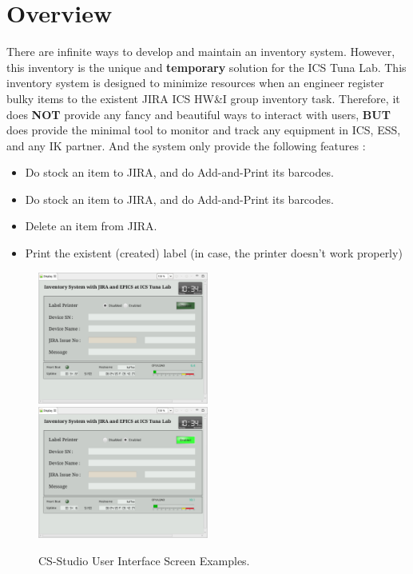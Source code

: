 \documentclass[11pt
  , a4paper
  , article
  , oneside
  , showtrims
]{memoir}
\begin{document}
\chapter{Overview}
There are infinite ways to develop and maintain an inventory system. However, this inventory is the unique and \textbf{temporary} solution for the ICS Tuna Lab. This inventory system is designed to minimize resources when an engineer register bulky items to the existent JIRA ICS HW\&I group inventory task. Therefore, it does \textbf{NOT} provide any fancy and beautiful ways to interact with users, \textbf{BUT} does provide the minimal tool to monitor and track any equipment in ICS, ESS, and any IK partner. And the system only provide the following features :
\begin{itemize}
\item Do stock an item to JIRA, and do Add-and-Print its barcodes.
\item Do stock an item to JIRA, and do Add-and-Print its barcodes.
\item Delete an item from JIRA.
\item Print the existent (created) label (in case, the printer doesn't work properly)
\end{itemize}


\begin{figure}[!htb]
  \includegraphics[width=0.5\textwidth]{./pictures/inv01.eps}
  \includegraphics[width=0.5\textwidth]{./pictures/inv02.eps}
  \caption{
            CS-Studio User Interface Screen Examples.
          }
  \label{fig:css-examples}   
\end{figure}
\end{document}
